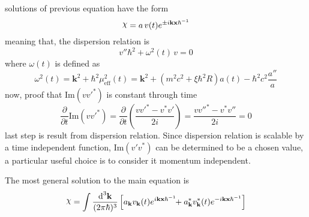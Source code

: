 \documentclass[pt=11, openany,twoside,a4paper]{scrbook}
\DeclareRobustCommand{\rchi}{{\mathpalette\irchi\relax}}
\newcommand{\irchi}[2]{\raisebox{\depth}{$#1\chi$}} %
\begin{document}
	solutions of previous equation have the form
	\begin{equation}
		\rchi=a\,v(t)e^{\pm i\mathbf{kx}\hbar^{-1}}
	\end{equation}
	meaning that, the dispersion relation is
	\begin{equation}
		v''\hbar^2+\omega^2(t)\,v=0
	\end{equation}
	where $\omega(t)$ is defined as
	\begin{equation}
		\omega^2(t)=\mathbf{k}^2+\hbar^2\mu_{\text{eff}}^2(t)=\mathbf{k}^2+\left(m^2c^2+\xi\hbar^2 R\right)a(t)-\hbar^2c^2\frac{a''}{a}
	\end{equation}
	now, proof that Im$(vv'^{*})$ is constant through time
	\begin{equation}
		\frac{\partial}{\partial t}\text{Im}(vv'^{*})=\frac{\partial}{\partial t}\left(\frac{vv'^{*}-v^{*}v'}{2i}\right)=\frac{vv''^*-v^{*}v''}{2i}=0
	\end{equation}
	last step is result from dispersion relation. Since dispersion relation is scalable by a time independent function, Im$(v'v^*)$ can be determined to be a chosen value, a particular useful choice is to consider it momentum independent.
	
	
	
	The most general solution to the main equation is
	\begin{equation}
		\rchi=\int\frac{\td^3\mathbf{k}}{(2\pi\hbar)^3}\left[a_\mathbf{k}v_\mathbf{k}(t)e^{i\mathbf{kx}\hbar^{-1}}\!\!+a_\mathbf{k}^*v_\mathbf{k}^*(t)e^{-i\mathbf{kx}\hbar^{-1}}\right]
	\end{equation}
	
\end{document}
